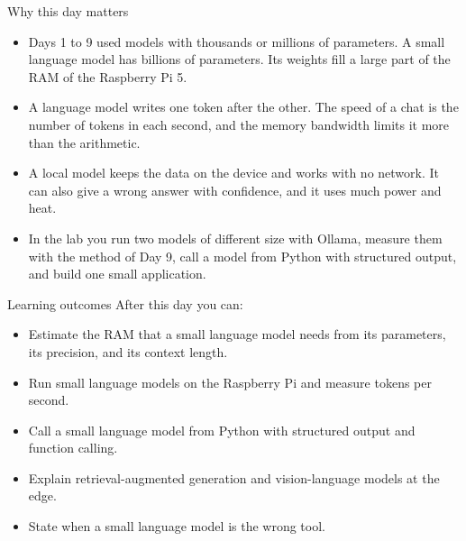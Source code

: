 \begin{frame}{Why this day matters}
  \begin{itemize}
    \item Days 1 to 9 used models with thousands or millions of parameters. A
          small language model has billions of parameters. Its weights fill a
          large part of the RAM of the Raspberry Pi 5.
    \item A language model writes one token after the other. The speed of a
          chat is the number of tokens in each second, and the memory
          bandwidth limits it more than the arithmetic.
    \item A local model keeps the data on the device and works with no
          network. It can also give a wrong answer with confidence, and it
          uses much power and heat.
    \item In the lab you run two models of different size with Ollama, measure
          them with the method of Day 9, call a model from Python with
          structured output, and build one small application.
  \end{itemize}
\end{frame}

\begin{frame}{Learning outcomes}
  After this day you can:
  \begin{itemize}
    \item Estimate the RAM that a small language model needs from its
          parameters, its precision, and its context length.
    \item Run small language models on the Raspberry Pi and measure tokens per
          second.
    \item Call a small language model from Python with structured output and
          function calling.
    \item Explain retrieval-augmented generation and vision-language models at
          the edge.
    \item State when a small language model is the wrong tool.
  \end{itemize}
\end{frame}
